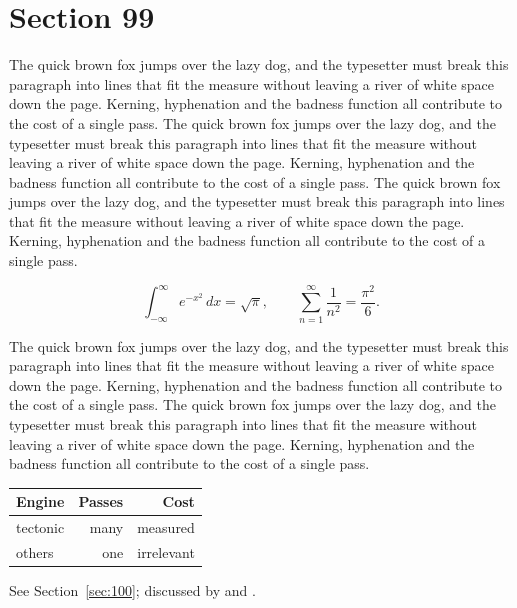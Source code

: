 \documentclass{article}
\begin{document}
\section{Section 99}
\label{sec:99}
The quick brown fox jumps over the lazy dog, and the typesetter must break this paragraph into lines that fit the measure without leaving a river of white space down the page. Kerning, hyphenation and the badness function all contribute to the cost of a single pass. The quick brown fox jumps over the lazy dog, and the typesetter must break this paragraph into lines that fit the measure without leaving a river of white space down the page. Kerning, hyphenation and the badness function all contribute to the cost of a single pass. The quick brown fox jumps over the lazy dog, and the typesetter must break this paragraph into lines that fit the measure without leaving a river of white space down the page. Kerning, hyphenation and the badness function all contribute to the cost of a single pass. 

\begin{equation}\label{eq:99}
\int_{-\infty}^{\infty} e^{-x^{2}}\,dx = \sqrt{\pi}, \qquad
\sum_{n=1}^{\infty} \frac{1}{n^{2}} = \frac{\pi^{2}}{6}.
\end{equation}

The quick brown fox jumps over the lazy dog, and the typesetter must break this paragraph into lines that fit the measure without leaving a river of white space down the page. Kerning, hyphenation and the badness function all contribute to the cost of a single pass. The quick brown fox jumps over the lazy dog, and the typesetter must break this paragraph into lines that fit the measure without leaving a river of white space down the page. Kerning, hyphenation and the badness function all contribute to the cost of a single pass. 

\begin{center}
\begin{tabular}{lrr}
\toprule
Engine & Passes & Cost \\
\midrule
tectonic & many & measured \\
others & one & irrelevant \\
\bottomrule
\end{tabular}
\end{center}

See Section~\ref{sec:100}; discussed by \textcite{k5} and \textcite{l2}.
\end{document}
